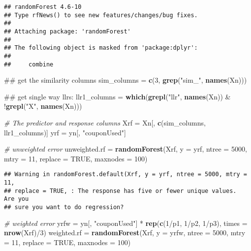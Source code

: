\documentclass[10pt]{report}
\newenvironment{Shaded}{}{}
\newcommand{\KeywordTok}[1]{\textcolor[rgb]{0.00,0.44,0.13}{\textbf{{#1}}}}
\newcommand{\DataTypeTok}[1]{\textcolor[rgb]{0.56,0.13,0.00}{{#1}}}
\newcommand{\DecValTok}[1]{\textcolor[rgb]{0.25,0.63,0.44}{{#1}}}
\newcommand{\StringTok}[1]{\textcolor[rgb]{0.25,0.44,0.63}{{#1}}}
\newcommand{\CommentTok}[1]{\textcolor[rgb]{0.38,0.63,0.69}{\textit{{#1}}}}
\newcommand{\OtherTok}[1]{\textcolor[rgb]{0.00,0.44,0.13}{{#1}}}
\newcommand{\NormalTok}[1]{{#1}}
\begin{document}
\begin{verbatim}
## randomForest 4.6-10
## Type rfNews() to see new features/changes/bug fixes.
## 
## Attaching package: 'randomForest'
## 
## The following object is masked from 'package:dplyr':
## 
##     combine
\end{verbatim}

\begin{Shaded}
\begin{Highlighting}[]
\NormalTok{## get the similarity columns}
\NormalTok{sim_columns =}\StringTok{ }\KeywordTok{c}\NormalTok{(}\DecValTok{3}\NormalTok{, }\KeywordTok{grep}\NormalTok{(}\StringTok{"sim_"}\NormalTok{, }\KeywordTok{names}\NormalTok{(Xn)))}

\NormalTok{## get single way llrs:}
\NormalTok{llr1_columns =}\StringTok{ }\KeywordTok{which}\NormalTok{(}\KeywordTok{grepl}\NormalTok{(}\StringTok{"llr"}\NormalTok{, }\KeywordTok{names}\NormalTok{(Xn)) &}\StringTok{ }\NormalTok{!}\KeywordTok{grepl}\NormalTok{(}\StringTok{"X"}\NormalTok{, }\KeywordTok{names}\NormalTok{(Xn)))}

\CommentTok{# The predictor and response columns}
\NormalTok{Xrf =}\StringTok{ }\NormalTok{Xn[, }\KeywordTok{c}\NormalTok{(sim_columns, llr1_columns)]}
\NormalTok{yrf =}\StringTok{ }\NormalTok{yn[, }\StringTok{"couponUsed"}\NormalTok{]}

\CommentTok{# unweighted error}
\NormalTok{unweighted.rf =}\StringTok{ }\KeywordTok{randomForest}\NormalTok{(Xrf, }\DataTypeTok{y =} \NormalTok{yrf, }\DataTypeTok{ntree =} \DecValTok{5000}\NormalTok{, }\DataTypeTok{mtry =} \DecValTok{11}\NormalTok{, }\DataTypeTok{replace =} \OtherTok{TRUE}\NormalTok{, }
    \DataTypeTok{maxnodes =} \DecValTok{100}\NormalTok{)}
\end{Highlighting}
\end{Shaded}

\begin{verbatim}
## Warning in randomForest.default(Xrf, y = yrf, ntree = 5000, mtry = 11,
## replace = TRUE, : The response has five or fewer unique values.  Are you
## sure you want to do regression?
\end{verbatim}

\begin{Shaded}
\begin{Highlighting}[]
\CommentTok{# weighted error}
\NormalTok{yrfw =}\StringTok{ }\NormalTok{yn[, }\StringTok{"couponUsed"}\NormalTok{] *}\StringTok{ }\KeywordTok{rep}\NormalTok{(}\KeywordTok{c}\NormalTok{(}\DecValTok{1}\NormalTok{/p1, }\DecValTok{1}\NormalTok{/p2, }\DecValTok{1}\NormalTok{/p3), }\DataTypeTok{times =} \KeywordTok{nrow}\NormalTok{(Xrf)/}\DecValTok{3}\NormalTok{)}
\NormalTok{weighted.rf =}\StringTok{ }\KeywordTok{randomForest}\NormalTok{(Xrf, }\DataTypeTok{y =} \NormalTok{yrfw, }\DataTypeTok{ntree =} \DecValTok{5000}\NormalTok{, }\DataTypeTok{mtry =} \DecValTok{11}\NormalTok{, }\DataTypeTok{replace =} \OtherTok{TRUE}\NormalTok{, }
    \DataTypeTok{maxnodes =} \DecValTok{100}\NormalTok{)}
\end{Highlighting}
\end{Shaded}
\end{document}
